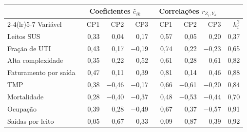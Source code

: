 \begin{tabular}{lrrrrrrr}
\toprule
& \multicolumn{3}{c}{Coeficientes $\hat e_{ik}$} & \multicolumn{3}{c}{Correlações $r_{Z_i,Y_k}$} & \\
\cmidrule(lr){2-4}\cmidrule(lr){5-7}
Variável & CP1 & CP2 & CP3 & CP1 & CP2 & CP3 & $h_i^2$ \\
\midrule
Leitos SUS & 0,33 & 0,04 & 0,17 & 0,57 & 0,05 & 0,20 & 0,37 \\
Fração de UTI & 0,43 & 0,17 & \ensuremath{-}0,19 & 0,74 & 0,22 & \ensuremath{-}0,23 & 0,65 \\
Alta complexidade & 0,35 & 0,22 & 0,52 & 0,61 & 0,28 & 0,61 & 0,82 \\
Faturamento por saída & 0,47 & 0,11 & 0,39 & 0,81 & 0,14 & 0,46 & 0,88 \\
TMP & 0,38 & \ensuremath{-}0,46 & \ensuremath{-}0,17 & 0,66 & \ensuremath{-}0,61 & \ensuremath{-}0,20 & 0,84 \\
Mortalidade & 0,28 & \ensuremath{-}0,40 & \ensuremath{-}0,37 & 0,48 & \ensuremath{-}0,53 & \ensuremath{-}0,44 & 0,70 \\
Ocupação & 0,39 & 0,28 & \ensuremath{-}0,49 & 0,67 & 0,37 & \ensuremath{-}0,57 & 0,91 \\
Saídas por leito & \ensuremath{-}0,05 & 0,67 & \ensuremath{-}0,33 & \ensuremath{-}0,09 & 0,87 & \ensuremath{-}0,39 & 0,92 \\
\bottomrule
\end{tabular}
